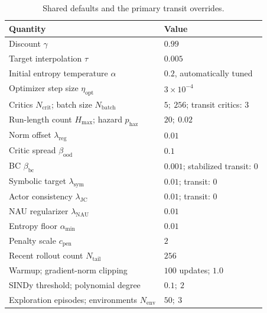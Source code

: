 \begin{table}[H]
\centering
\caption{Shared defaults and the primary transit overrides.}
\label{tab:hyperparams}
\small
\begin{tabular}{ll}
\toprule
Quantity & Value \\
\midrule
Discount \(\gamma\) & \(0.99\) \\
Target interpolation \(\tau\) & \(0.005\) \\
Initial entropy temperature \(\alpha\) & \(0.2\), automatically tuned \\
Optimizer step size \(\eta_{\mathrm{opt}}\) & \(3\times10^{-4}\) \\
Critics \(N_{\mathrm{crit}}\); batch size \(N_{\mathrm{batch}}\) & \(5;\ 256\); transit critics: \(3\) \\
Run-length count \(H_{\max}\); hazard \(p_{\mathrm{haz}}\) & \(20;\ 0.02\) \\
Norm offset \(\lambda_{\mathrm{reg}}\) & \(0.01\) \\
Critic spread \(\beta_{\mathrm{ood}}\) & \(0.1\) \\
BC \(\beta_{\mathrm{bc}}\) & \(0.001\); stabilized transit: \(0\) \\
Symbolic target \(\lambda_{\mathrm{sym}}\) & \(0.01\); transit: \(0\) \\
Actor consistency \(\lambda_{\mathrm{JC}}\) & \(0.01\); transit: \(0\) \\
NAU regularizer \(\lambda_{\mathrm{NAU}}\) & \(0.01\) \\
Entropy floor \(\alpha_{\min}\) & \(0.01\) \\
Penalty scale \(c_{\mathrm{pen}}\) & \(2\) \\
Recent rollout count \(N_{\mathrm{tail}}\) & \(256\) \\
Warmup; gradient-norm clipping & \(100\) updates; \(1.0\) \\
SINDy threshold; polynomial degree & \(0.1;\ 2\) \\
Exploration episodes; environments \(N_{\mathrm{env}}\) & \(50;\ 3\) \\
\bottomrule
\end{tabular}
\end{table}
